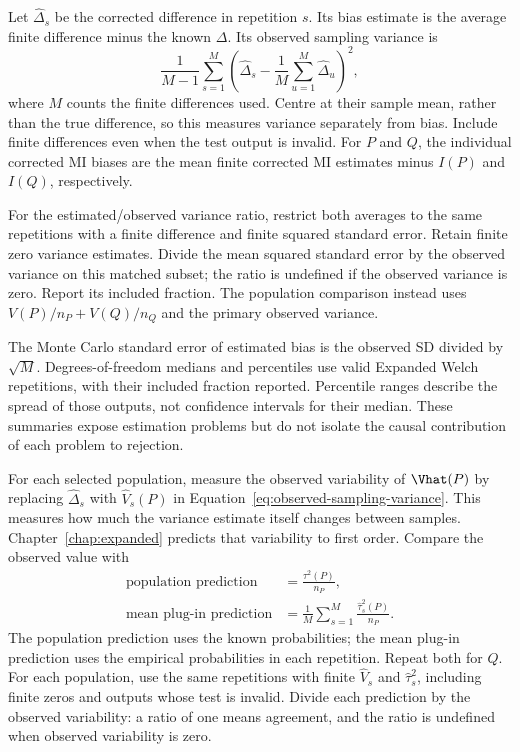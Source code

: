 Let \(\widehat\Delta_s\) be the corrected difference in repetition
\(s\). Its bias estimate is the average finite difference minus the
known \(\Delta\). Its observed sampling variance is
\begin{equation}
 \frac{1}{M-1}\sum_{s=1}^M
 \left(\widehat\Delta_s-\frac{1}{M}\sum_{u=1}^M\widehat\Delta_u\right)^2,
 \label{eq:observed-sampling-variance}
\end{equation}
where \(M\) counts the finite differences used. Centre at their sample
mean, rather than the true difference, so this measures variance
separately from bias. Include finite differences even when the test
output is invalid. For \(P\) and \(Q\), the individual corrected MI biases
are the mean finite corrected MI estimates minus \(I(P)\) and \(I(Q)\),
respectively.

For the estimated/observed variance ratio, restrict both averages to
the same repetitions with a finite difference and finite squared
standard error. Retain finite zero variance estimates. Divide the mean
squared standard error by the observed variance on this matched subset;
the ratio is undefined if the observed variance is zero. Report its
included fraction. The population comparison instead uses
\(V(P)/n_P+V(Q)/n_Q\) and the primary observed variance.

The Monte Carlo standard error of estimated bias is the observed SD
divided by \(\sqrt M\). Degrees-of-freedom medians and percentiles
use valid Expanded Welch repetitions, with their included fraction
reported. Percentile ranges describe the spread of those outputs,
not confidence intervals for their median. These summaries expose
estimation problems but do not isolate the causal contribution of
each problem to rejection.

\medskip
{}

For each selected population, measure the observed variability of
\(\Vhat(P)\) by replacing \(\widehat\Delta_s\) with
\(\widehat V_s(P)\) in Equation~\eqref{eq:observed-sampling-variance}.
This measures how much the variance estimate itself changes between
samples. Chapter~\ref{chap:expanded} predicts that variability to first
order. Compare the observed value with
\begin{equation}
\begin{aligned}
 \text{population prediction}&=\frac{\tau^2(P)}{n_P},\\
 \text{mean plug-in prediction}&=
 \frac{1}{M}\sum_{s=1}^{M}\frac{\widehat\tau_s^2(P)}{n_P}.
\end{aligned}
 \label{eq:variance-stability-predictions}
\end{equation}
The population prediction uses the known probabilities; the mean plug-in
prediction uses the empirical probabilities in each repetition. Repeat both for
\(Q\). For each population, use the same repetitions with finite
\(\widehat V_s\) and \(\widehat\tau_s^2\), including finite zeros
and outputs whose test is invalid. Divide each prediction by the observed
variability: a ratio of one means agreement, and the ratio is undefined
when observed variability is zero.

